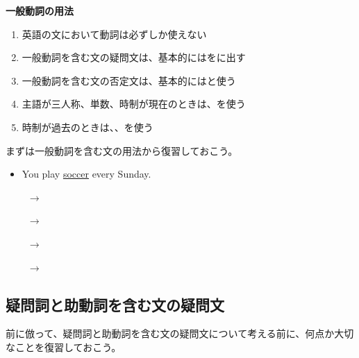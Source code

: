     \begin{theorembox}{\textbf{一般動詞の用法}}
        \begin{enumerate}
            \item 英語の文において動詞は必ずしか使えない
            \item 一般動詞を含む文の疑問文は、基本的にはをに出す
            \item 一般動詞を含む文の否定文は、基本的にはと使う
            \item 主語が三人称、単数、時制が現在のときは、を使う
            \item 時制が過去のときは、、を使う
        \end{enumerate}
    \end{theorembox}

    まずは一般動詞を含む文の用法から復習しておこう。

    \begin{itemize}
        \item You play \underline{soccer} every Sunday.
        \par\vspace{0.3em}
        \noindent{}\ $\longrightarrow$\ 
        \par\vspace{0.5em}
        \noindent{}\ $\longrightarrow$\ 
        \par\vspace{0.5em}
        \noindent{}\ $\longrightarrow$\ 
        \par\vspace{0.5em}
        \noindent{}\ $\longrightarrow$\ 
    \end{itemize}
\newpage

\subsection{疑問詞と助動詞を含む文の疑問文}
    前に倣って、疑問詞と助動詞を含む文の疑問文について考える前に、何点か大切なことを復習しておこう。

